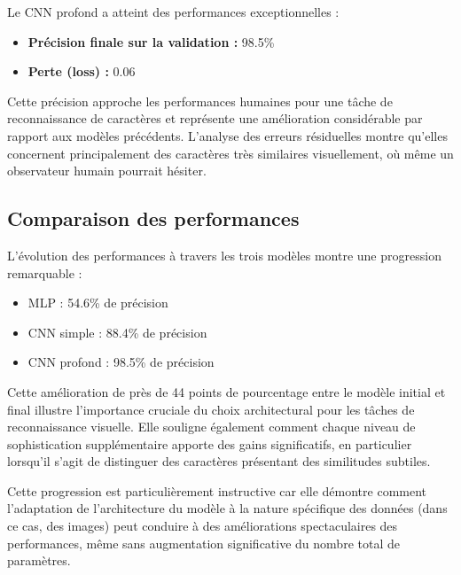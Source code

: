 \begin{flushleft}
Le CNN profond a atteint des performances exceptionnelles :

\begin{itemize}
\item \textbf{Précision finale sur la validation : }98.5\%
\item \textbf{Perte (loss) : }0.06
\end{itemize}

\bigskip

Cette précision approche les performances humaines pour une tâche de reconnaissance de caractères et représente une amélioration considérable par rapport aux modèles précédents. L'analyse des erreurs résiduelles montre qu'elles concernent principalement des caractères très similaires visuellement, où même un observateur humain pourrait hésiter.
\end{flushleft}

\subsection{Comparaison des performances}

\begin{flushleft}
L'évolution des performances à travers les trois modèles montre une progression remarquable :

\begin{itemize}
\item MLP : 54.6\% de précision
\item CNN simple : 88.4\% de précision
\item CNN profond : 98.5\% de précision
\end{itemize}

\bigskip

Cette amélioration de près de 44 points de pourcentage entre le modèle initial et final illustre l'importance cruciale du choix architectural pour les tâches de reconnaissance visuelle. Elle souligne également comment chaque niveau de sophistication supplémentaire apporte des gains significatifs, en particulier lorsqu'il s'agit de distinguer des caractères présentant des similitudes subtiles.

Cette progression est particulièrement instructive car elle démontre comment l'adaptation de l'architecture du modèle à la nature spécifique des données (dans ce cas, des images) peut conduire à des améliorations spectaculaires des performances, même sans augmentation significative du nombre total de paramètres.


\end{flushleft}

